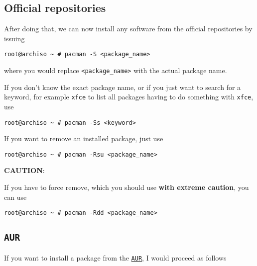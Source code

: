 \documentclass[9pt]{report}
\newcommand{\admonition}[2]{\textbf{#1}: {#2}}
\begin{document}
\hypertarget{x-official-repositories}{\subsection{Official repositories}}
After doing that, we can now install any software from the official repositories by issuing


\begin{verbatim}
root@archiso ~ # pacman -S <package_name>
\end{verbatim}

where you would replace \texttt{<package\_name>} with the actual package name.


If you don’t know the exact package name, or if you just want to search for a keyword, for example \texttt{xfce} to list all packages having to do something with \texttt{xfce}, use


\begin{verbatim}
root@archiso ~ # pacman -Ss <keyword>
\end{verbatim}

If you want to remove an installed package, just use


\begin{verbatim}
root@archiso ~ # pacman -Rsu <package_name>
\end{verbatim}

\admonition{CAUTION}{If you have to force remove, which you should use \textbf{with extreme caution}, you can use


}
\begin{verbatim}
root@archiso ~ # pacman -Rdd <package_name>
\end{verbatim}

\vfill\eject

\hypertarget{x-aur}{\subsection{\texttt{AUR}}}
If you want to install a package from the \href{https://aur.archlinux.org/}{\texttt{AUR}}, I would proceed as follows
\end{document}
